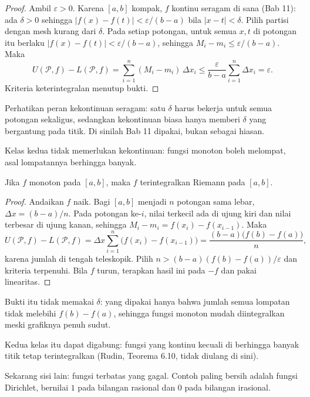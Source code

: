 \begin{proof}
Ambil $\varepsilon>0$. Karena $[a,b]$ kompak, $f$ kontinu seragam di sana (Bab 11):
ada $\delta>0$ sehingga $|f(x)-f(t)|<\varepsilon/(b-a)$ bila $|x-t|<\delta$. Pilih
partisi dengan mesh kurang dari $\delta$. Pada setiap potongan, untuk semua $x,t$ di
potongan itu berlaku $|f(x)-f(t)|<\varepsilon/(b-a)$, sehingga
$M_i-m_i\le\varepsilon/(b-a)$. Maka
\[
U(\mathcal{P},f)-L(\mathcal{P},f)
=\sum_{i=1}^{n}(M_i-m_i)\,\Delta x_i
\le\frac{\varepsilon}{b-a}\sum_{i=1}^{n}\Delta x_i=\varepsilon .
\]
Kriteria keterintegralan menutup bukti.
\end{proof}

Perhatikan peran kekontinuan seragam: satu $\delta$ harus bekerja untuk semua potongan
sekaligus, sedangkan kekontinuan biasa hanya memberi $\delta$ yang bergantung pada
titik. Di sinilah Bab 11 dipakai, bukan sebagai hiasan.

Kelas kedua tidak memerlukan kekontinuan: fungsi monoton boleh melompat, asal
lompatannya berhingga banyak.

\begin{teorema}
Jika $f$ monoton pada $[a,b]$, maka $f$ terintegralkan Riemann pada $[a,b]$.
\end{teorema}

\begin{proof}
Andaikan $f$ naik. Bagi $[a,b]$ menjadi $n$ potongan sama lebar, $\Delta x=(b-a)/n$.
Pada potongan ke-$i$, nilai terkecil ada di ujung kiri dan nilai terbesar di ujung
kanan, sehingga $M_i-m_i=f(x_i)-f(x_{i-1})$. Maka
\[
U(\mathcal{P},f)-L(\mathcal{P},f)
=\Delta x\sum_{i=1}^{n}\bigl(f(x_i)-f(x_{i-1})\bigr)
=\frac{(b-a)\bigl(f(b)-f(a)\bigr)}{n},
\]
karena jumlah di tengah teleskopik. Pilih $n>(b-a)(f(b)-f(a))/\varepsilon$ dan kriteria
terpenuhi. Bila $f$ turun, terapkan hasil ini pada $-f$ dan pakai linearitas.
\end{proof}

Bukti itu tidak memakai $\delta$: yang dipakai hanya bahwa jumlah semua lompatan tidak
melebihi $f(b)-f(a)$, sehingga fungsi monoton mudah diintegralkan meski grafiknya penuh
sudut.

Kedua kelas itu dapat digabung: fungsi yang kontinu kecuali di berhingga banyak titik
tetap terintegralkan (Rudin, Teorema 6.10, tidak diulang di sini).

Sekarang sisi lain: fungsi terbatas yang gagal. Contoh paling bersih adalah fungsi
Dirichlet, bernilai $1$ pada bilangan rasional dan $0$ pada bilangan irasional.

